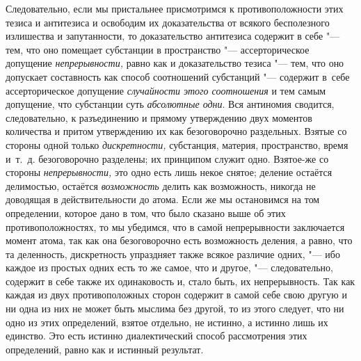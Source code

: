 Следовательно, если мы пристальнее присмотримся к противоположности этих тезиса
и антитезиса и освободим их доказательства от всякого бесполезного излишества и
запутанности, то доказательство антитезиса содержит в себе "--- тем, что оно
помещает субстанции в пространство "--- ассерторическое допущение
{\em непрерывности,} равно как и доказательство тезиса "--- тем, что оно
допускает составность как способ соотношений субстанций "--- содержит в~себе
ассерторическое допущение {\em случайности этого соотношения} и тем самым
допущение, что субстанции суть {\em абсолютные одни}. Вся антиномия сводится,
следовательно, к разъединению и прямому утверждению двух моментов количества и
притом утверждению их как безоговорочно раздельных. Взятые со стороны одной
только {\em дискретности,} субстанция, материя, пространство, время и~т.~д.
безоговорочно разделены; их принципом служит одно. Взятое-же со стороны
{\em непрерывности,} это одно есть лишь некое снятое; деление остаётся
делимостью, остаётся {\em возможность} делить как возможность, никогда не
доводящая в действительности до атома. Если же мы остановимся на том
определении, которое дано в том, что было сказано выше об этих
противоположностях, то мы убедимся, что в самой непрерывности заключается
момент атома, так как она безоговорочно есть возможность деления, а равно, что
та деленность, дискретность упраздняет также всякое различие одних, "--- ибо
каждое из простых одних есть то же самое, что и другое, "--- следовательно,
содержит в себе также их одинаковость и, стало быть, их непрерывность. Так как
каждая из двух противоположных сторон содержит в самой себе свою другую и ни
одна из них не может быть мыслима без другой, то из этого следует, что ни одно
из этих определений, взятое отдельно, не истинно, а истинно лишь их единство.
Это есть истинно диалектический способ рассмотрения этих определений, равно как
и истинный результат.

